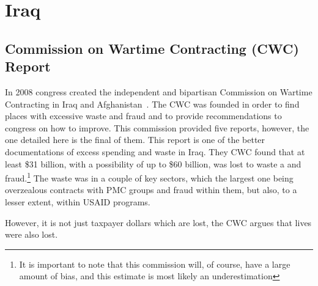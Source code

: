 \documentclass{article}
\begin{document}
\section{Iraq}
    \subsection{Commission on Wartime Contracting (CWC) Report}
        In 2008 congress created the independent and bipartisan Commission on Wartime Contracting in Iraq and Afghanistan~\parencite{CWC_2011}. The CWC was founded in order to find places with excessive waste and fraud and to provide recommendations to congress on how to improve. This commission provided five reports, however, the one detailed here is the final of them. This report is one of the better documentations of excess spending and waste in Iraq. They CWC found that at least \$31 billion, with a possibility of up to \$60 billion, was lost to waste a and fraud.\footnote{It is important to note that this commission will, of course, have a large amount of bias, and this estimate is most likely an underestimation} The waste was in a couple of key sectors, which the largest one being overzealous contracts with PMC groups and fraud within them, but also, to a lesser extent, within USAID programs.

        However, it is not just taxpayer dollars which are lost, the CWC argues that lives were also lost. 
\end{document}
